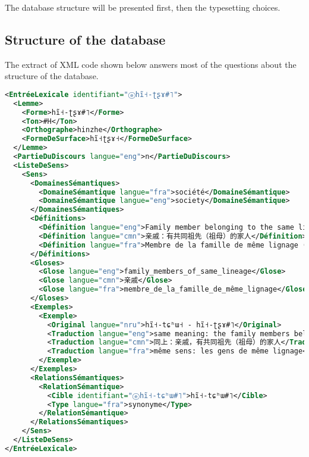 The database structure will be presented first, then the typesetting choices.

\subsection{Structure of the database}

The extract of XML code shown below answers most of the questions about the structure of the database.

\begin{lstlisting}[language=XML, caption=Excerpt from the Lexika XML code illustrating the structure of the entries, label=code:LexikaXML]
<EntréeLexicale identifiant="ⓔhĩ˧-ʈʂɤ#˥">
  <Lemme>
    <Forme>hĩ˧-ʈʂɤ#˥</Forme>
    <Ton>#H</Ton>
    <Orthographe>hinzhe</Orthographe>
    <FormeDeSurface>hĩ˧ʈʂɤ˧</FormeDeSurface>
  </Lemme>
  <PartieDuDiscours langue="eng">n</PartieDuDiscours>
  <ListeDeSens>
    <Sens>
      <DomainesSémantiques>
        <DomaineSémantique langue="fra">société</DomaineSémantique>
        <DomaineSémantique langue="eng">society</DomaineSémantique>
      </DomainesSémantiques>
      <Définitions>
        <Définition langue="eng">Family member belonging to the same lineage (on the mother's side).</Définition>
        <Définition langue="cmn">亲戚：有共同祖先（祖母）的家人</Définition>
        <Définition langue="fra">Membre de la famille de même lignage (du côté maternel).</Définition>
      </Définitions>
      <Gloses>
        <Glose langue="eng">family_members_of_same_lineage</Glose>
        <Glose langue="cmn">亲戚</Glose>
        <Glose langue="fra">membre_de_la_famille_de_même_lignage</Glose>
      </Gloses>
      <Exemples>
        <Exemple>
          <Original langue="nru">hĩ˧-tɕʰɯ˧ - hĩ˧-ʈʂɤ#˥</Original>
          <Traduction langue="eng">same meaning: the family members belonging to the same lineage</Traduction>
          <Traduction langue="cmn">同上：亲戚，有共同祖先（祖母）的家人</Traduction>
          <Traduction langue="fra">même sens: les gens de même lignage</Traduction>
        </Exemple>
      </Exemples>
      <RelationsSémantiques>
        <RelationSémantique>
          <Cible identifiant="ⓔhĩ˧-tɕʰɯ#˥">hĩ˧-tɕʰɯ#˥</Cible>
          <Type langue="fra">synonyme</Type>
        </RelationSémantique>
      </RelationsSémantiques>
    </Sens>
  </ListeDeSens>
</EntréeLexicale>
\end{lstlisting}


